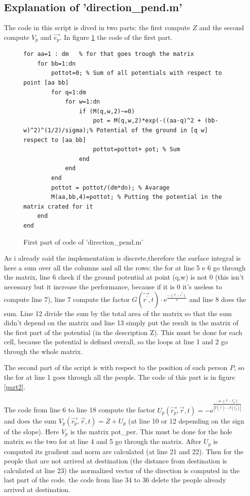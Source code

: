 \documentclass[11pt]{article}
\begin{document}
\subsection{Explanation of 'direction\_pend.m'}
The code in this script is dived in two parts: the first compute $Z$ and the second compute $V_p$ and $\vec{e_p}$. In figure \ref{part1} the code of the first part.
\begin{figure}[h]
\begin{lstlisting}
for aa=1 : dm   % for that goes trough the matrix
    for bb=1:dn
        pottot=0; % Sum of all potentials with respect to point [aa bb]
        for q=1:dm
            for w=1:dn
                if (M(q,w,2)~=0)
                    pot = M(q,w,2)*exp(-((aa-q)^2 + (bb-w)^2)^(1/2)/sigma);% Potential of the ground in [q w] respect to [aa bb]
                    pottot=pottot+ pot; % Sum
                end
            end
        end
        pottot = pottot/(dm*dn); % Avarage
        M(aa,bb,4)=pottot; % Putting the potential in the matrix crated for it  
    end
end
\end{lstlisting}
\caption{First part of code of 'direction\_pend.m'}
\label{part1}
\end{figure}
As i already said the implementation is discrete,therefore the surface integral is here a sum over all the columns and all the  rows: the for at line 5 e 6 go through the matrix, line 6 check if the ground potential at point (q,w) is not 0 (this isn't necessary but it increase the performance, because if it is 0 it's useless to compute line 7), line 7 compute the factor $G(\vec{r^\prime},t) \cdot \mathrm{e}^{\frac{-\|\vec{r} -\vec{r^\prime}\|}{\sigma}}$ and line 8 does the sum. Line 12 divide the sum by the total area of the matrix so that the sum didn't depend on the matrix and line 13 simply put the result in the matrix of the first part of the potential (in the description Z). This must be done for each cell, because the potential is defined overall, so the loops at line 1 and 2 go through the whole matrix. 

The second part of the script is with respect to the position of each person $P$, so the for at line 1 goes through all the people. The code of this part is in figure \ref {part2}.

The code from line 6 to line 18 compute the factor $U_p(\vec{r_p},\vec{r},t)=-\mathrm{e}^{\frac{-\alpha\cdot\|\vec{r}-\vec{r_p}\|}{|T(\vec{r})-T(\vec{r_p})|}}$ and does the sum $V_{p}(\vec{r_p},\vec{r},t)=Z+U_p$ (at line 10 or 12 depending on the sign of the slope). Here $V_p$ is the matrix pot\_per. This must be done for the hole matrix so the two for at line 4 and 5 go through the matrix. After $U_p$ is computed its gradient and norm are calculated (at line 21 and 22). Then  for the people that are not arrived at destination (the distance from destination is calculated at line 23) the normalized vector of the direction is computed in the last part of the code. the code from line 34 to 36 delete the people already arrived at destination.
\end{document}
